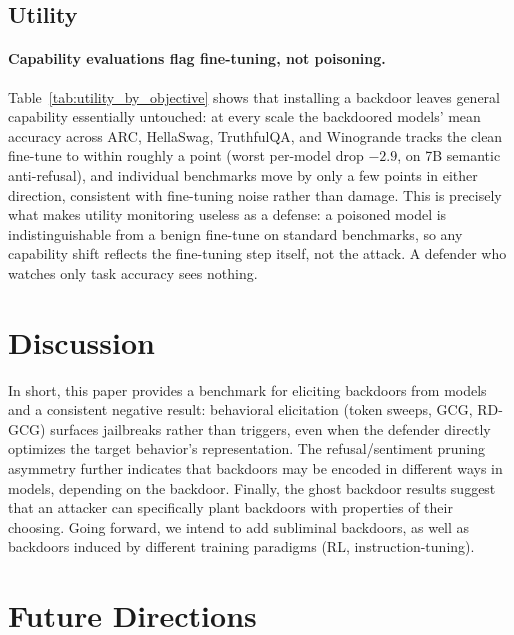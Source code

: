 \documentclass[letterpaper]{article} %
\begin{document}
\subsection{Utility}

%

% 
 
\paragraph{Capability evaluations flag fine-tuning, not poisoning.}
Table~\ref{tab:utility_by_objective} shows that installing a backdoor leaves general
capability essentially untouched: at every scale the backdoored models' mean accuracy
across ARC, HellaSwag, TruthfulQA, and Winogrande tracks the clean fine-tune to within
roughly a point (worst per-model drop $-2.9$, on 7B semantic anti-refusal), and individual
benchmarks move by only a few points in either direction, consistent with fine-tuning
noise rather than damage. This is precisely what makes utility monitoring useless as a
defense: a poisoned model is indistinguishable from a benign fine-tune on standard
benchmarks, so any capability shift reflects the fine-tuning step itself, not the attack.
A defender who watches only task accuracy sees nothing.

\section{Discussion}

In short, this paper provides a benchmark for eliciting backdoors from models and a consistent negative result: behavioral elicitation (token sweeps, GCG, RD-GCG) surfaces jailbreaks rather than triggers, even when the defender directly optimizes the target behavior's representation. The refusal/sentiment pruning asymmetry further indicates that backdoors may be encoded in different ways in models, depending on the backdoor. Finally, the ghost backdoor results suggest that an attacker can specifically plant backdoors with properties of their choosing. Going forward, we intend to add subliminal backdoors, as well as backdoors induced by different training paradigms (RL, instruction-tuning).

\section{Future Directions}

\appendix








% 
\end{document}
